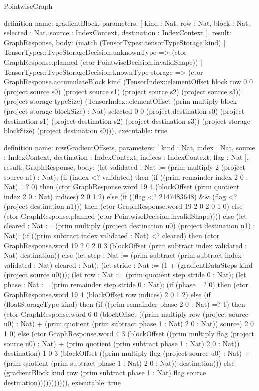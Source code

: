 \begin{lexlean}{PointwiseGraph}
\begin{semanticmodule}
definition{
  name: gradientBlock,
  parameters: [
    kind : Nat,
    row : Nat,
    block : Nat,
    selected : Nat,
    source : IndexContext,
    destination : IndexContext
  ],
  result: GraphResponse,
  body: (match (TensorTypes::tensorTypeStorage kind)
    | TensorTypes::TypeStorageDecision.unknownType => (ctor GraphResponse.planned (ctor PointwiseDecision.invalidShape))
    | TensorTypes::TypeStorageDecision.knownType storage => (ctor GraphResponse.accumulateBlock kind (TensorIndex::elementOffset block row 0 0 (project source s0) (project source s1) (project source s2) (project source s3)) (project storage typeSize) (TensorIndex::elementOffset (prim multiply block (project storage blockSize) : Nat) selected 0 0 (project destination s0) (project destination s1) (project destination s2) (project destination s3)) (project storage blockSize) (project destination s0))),
  executable: true
}

definition{
  name: rowGradientOffsets,
  parameters: [
    kind : Nat,
    index : Nat,
    source : IndexContext,
    destination : IndexContext,
    indices : IndexContext,
    flag : Nat
  ],
  result: GraphResponse,
  body: (let validated : Nat := (prim multiply 2 (project source n1) : Nat); (if (index <? validated) then (if ((prim remainder index 2 0 : Nat) =? 0) then (ctor GraphResponse.word 19 4 (blockOffset (prim quotient index 2 0 : Nat) indices) 2 0 1 2) else (if ((flag <? 2147483648) && (flag <? (project destination n1))) then (ctor GraphResponse.word 19 2 0 2 0 1 0) else (ctor GraphResponse.planned (ctor PointwiseDecision.invalidShape)))) else (let cleared : Nat := (prim multiply (project destination u0) (project destination n1) : Nat); (if ((prim subtract index validated : Nat) <? cleared) then (ctor GraphResponse.word 19 2 0 2 0 3 (blockOffset (prim subtract index validated : Nat) destination)) else (let step : Nat := (prim subtract (prim subtract index validated : Nat) cleared : Nat); (let stride : Nat := (1 + (gradientDataSteps kind (project source u0))); (let row : Nat := (prim quotient step stride 0 : Nat); (let phase : Nat := (prim remainder step stride 0 : Nat); (if (phase =? 0) then (ctor GraphResponse.word 19 4 (blockOffset row indices) 2 0 1 2) else (if (floatStorageType kind) then (if ((prim remainder phase 2 0 : Nat) =? 1) then (ctor GraphResponse.word 6 0 (blockOffset ((prim multiply row (project source u0) : Nat) + (prim quotient (prim subtract phase 1 : Nat) 2 0 : Nat)) source) 2 0 1 0) else (ctor GraphResponse.word 4 3 (blockOffset ((prim multiply flag (project source u0) : Nat) + (prim quotient (prim subtract phase 1 : Nat) 2 0 : Nat)) destination) 1 0 3 (blockOffset ((prim multiply flag (project source u0) : Nat) + (prim quotient (prim subtract phase 1 : Nat) 2 0 : Nat)) destination))) else (gradientBlock kind row (prim subtract phase 1 : Nat) flag source destination))))))))))),
  executable: true
}


\end{semanticmodule}
\end{lexlean}
